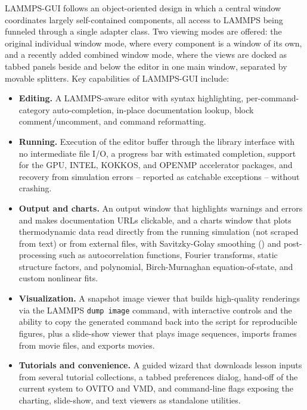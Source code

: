 \documentclass[
]{article}
\providecommand{\tightlist}{%
  \setlength{\itemsep}{0pt}\setlength{\parskip}{0pt}}
\begin{document}
LAMMPS-GUI follows an object-oriented design in which a central window
coordinates largely self-contained components, all access to LAMMPS
being funneled through a single adapter class. Two viewing modes are
offered: the original individual window mode, where every component is a
window of its own, and a recently added combined window mode, where the
views are docked as tabbed panels beside and below the editor in one
main window, separated by movable splitters. Key capabilities of
LAMMPS-GUI include:

\begin{itemize}
\tightlist
\item
  \textbf{Editing.} A LAMMPS-aware editor with syntax highlighting,
  per-command-category auto-completion, in-place documentation lookup,
  block comment/uncomment, and command reformatting.
\item
  \textbf{Running.} Execution of the editor buffer through the library
  interface with no intermediate file I/O, a progress bar with estimated
  completion, support for the GPU, INTEL, KOKKOS, and OPENMP accelerator
  packages, and recovery from simulation errors -- reported as catchable
  exceptions -- without crashing.
\item
  \textbf{Output and charts.} An output window that highlights warnings
  and errors and makes documentation URLs clickable, and a charts window
  that plots thermodynamic data read directly from the running
  simulation (not scraped from text) or from external files, with
  Savitzky-Golay smoothing () and post-processing such as autocorrelation functions,
  Fourier transforms, static structure factors, and polynomial,
  Birch-Murnaghan equation-of-state, and custom nonlinear fits.
\item
  \textbf{Visualization.} A snapshot image viewer that builds
  high-quality renderings via the LAMMPS \texttt{dump\ image} command,
  with interactive controls and the ability to copy the generated
  command back into the script for reproducible figures, plus a
  slide-show viewer that plays image sequences, imports frames from
  movie files, and exports movies.
\item
  \textbf{Tutorials and convenience.} A guided wizard that downloads
  lesson inputs from several tutorial collections, a tabbed preferences
  dialog, hand-off of the current system to OVITO and VMD, and
  command-line flags exposing the charting, slide-show, and text viewers
  as standalone utilities.
\end{itemize}
\end{document}
